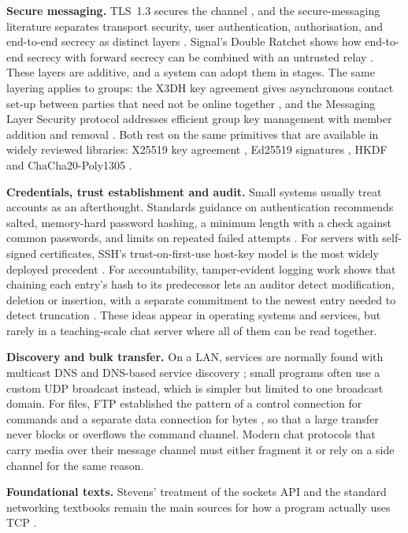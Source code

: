 \documentclass[conference]{IEEEtran}
\begin{document}
\textbf{Secure messaging.} TLS~1.3 secures the channel \cite{rfc8446}, and the secure-messaging literature separates transport security, user authentication, authorisation, and end-to-end secrecy as distinct layers \cite{unger}. Signal's Double Ratchet shows how end-to-end secrecy with forward secrecy can be combined with an untrusted relay \cite{signal,cohngordon}. These layers are additive, and a system can adopt them in stages. The same layering applies to groups: the X3DH key agreement gives asynchronous contact set-up between parties that need not be online together \cite{x3dh}, and the Messaging Layer Security protocol addresses efficient group key management with member addition and removal \cite{rfc9420}. Both rest on the same primitives that are available in widely reviewed libraries: X25519 key agreement \cite{rfc7748}, Ed25519 signatures \cite{rfc8032}, HKDF \cite{rfc5869} and ChaCha20-Poly1305 \cite{rfc8439}.

\textbf{Credentials, trust establishment and audit.} Small systems usually treat accounts as an afterthought. Standards guidance on authentication recommends salted, memory-hard password hashing, a minimum length with a check against common passwords, and limits on repeated failed attempts \cite{nist63b,rfc7914}. For servers with self-signed certificates, SSH's trust-on-first-use host-key model is the most widely deployed precedent \cite{rfc4251}. For accountability, tamper-evident logging work shows that chaining each entry's hash to its predecessor lets an auditor detect modification, deletion or insertion, with a separate commitment to the newest entry needed to detect truncation \cite{schneier99,crosby09}. These ideas appear in operating systems and services, but rarely in a teaching-scale chat server where all of them can be read together.

\textbf{Discovery and bulk transfer.} On a LAN, services are normally found with multicast DNS and DNS-based service discovery \cite{rfc6762,rfc6763}; small programs often use a custom UDP broadcast instead, which is simpler but limited to one broadcast domain. For files, FTP established the pattern of a control connection for commands and a separate data connection for bytes \cite{rfc959}, so that a large transfer never blocks or overflows the command channel. Modern chat protocols that carry media over their message channel must either fragment it or rely on a side channel for the same reason.

\textbf{Foundational texts.} Stevens' treatment of the sockets API and the standard networking textbooks remain the main sources for how a program actually uses TCP \cite{stevens,tanenbaum,kurose}.
\end{document}
